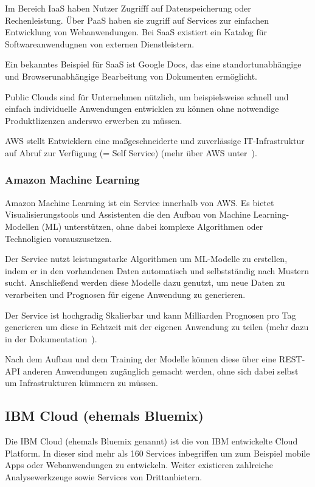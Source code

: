 Im Bereich IaaS haben Nutzer Zugrifff auf Datenspeicherung oder Rechenleistung. Über PaaS haben sie zugriff auf
Services zur einfachen Entwicklung von Webanwendungen. Bei SaaS existiert ein Katalog für Softwareanwendugnen von
externen Dienstleistern.

Ein bekanntes Beispiel für SaaS ist Google Docs, das eine standortunabhängige und Browserunabhängige Bearbeitung von
Dokumenten ermöglicht.

Public Clouds sind für Unternehmen nützlich, um beispielsweise schnell und einfach individuelle Anwendungen entwicklen
zu können ohne notwendige Produktlizenzen anderswo erwerben zu müssen.

AWS stellt Entwicklern eine maßgeschneiderte und zuverlässige IT-Infrastruktur auf Abruf zur Verfügung (= Self Service)
(mehr über AWS unter~\cite{online_grundlagen_aws}).

\subsubsection{Amazon Machine Learning}
Amazon Machine Learning ist ein Service innerhalb von AWS. Es bietet Visualisierungstools und Assistenten die den Aufbau
von Machine Learning-Modellen (ML) unterstützen, ohne dabei komplexe Algorithmen oder Technoligien vorauszusetzen.

Der Service nutzt leistungsstarke Algorithmen um ML-Modelle zu erstellen, indem er in den vorhandenen Daten automatisch
und selbstständig nach Mustern sucht. Anschließend werden diese Modelle dazu genutzt, um neue Daten zu verarbeiten und
Prognosen für eigene Anwendung zu generieren.

Der Service ist hochgradig Skalierbar und kann Milliarden Prognosen pro Tag generieren um diese in Echtzeit mit der
eigenen Anwendung zu teilen (mehr dazu in der Dokumentation~\cite{online_grundlagen_aws_learning}).

Nach dem Aufbau und dem Training der Modelle können diese über eine REST-API anderen Anwendungen zugänglich gemacht
werden, ohne sich dabei selbst um Infrastrukturen kümmern zu müssen.

\subsection{IBM Cloud (ehemals Bluemix)}
Die IBM Cloud (ehemals Bluemix genannt) ist die von IBM entwickelte Cloud Platform. In dieser sind mehr als 160 Services
inbegriffen um zum Beispiel mobile Apps oder Webanwendungen zu entwickeln. Weiter existieren zahlreiche Analysewerkzeuge
sowie Services von Drittanbietern.

